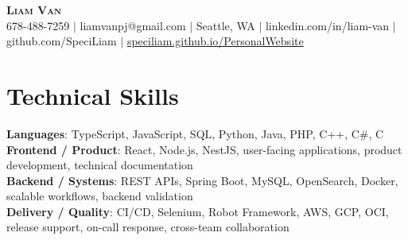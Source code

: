\documentclass[letterpaper,11pt]{article}
\begin{document}

%
\begin{center}
    \textbf{\Huge \scshape Liam Van} \\ \vspace{1pt}
    \small 678-488-7259 $|$ \small {liamvanpj@gmail.com} $|$ Seattle, WA
 {{$|$ linkedin.com/in/liam-van} {$|$ github.com/SpeciLiam} {$|$ \href{https://speciliam.github.io/PersonalWebsite}{speciliam.github.io/PersonalWebsite}}}

\end{center}

\section{Technical Skills}
 \begin{itemize}[leftmargin=0.15in, label={}]
    \small{\item{
     \textbf{Languages}{: TypeScript, JavaScript, SQL, Python, Java, PHP, C++, C\#, C} \\
     \textbf{Frontend / Product}{: React, Node.js, NestJS, user-facing applications, product development, technical documentation} \\
     \textbf{Backend / Systems}{: REST APIs, Spring Boot, MySQL, OpenSearch, Docker, scalable workflows, backend validation} \\
     \textbf{Delivery / Quality}{: CI/CD, Selenium, Robot Framework, AWS, GCP, OCI, release support, on-call response, cross-team collaboration} \\
    }}
 \end{itemize}
%
\end{document}

